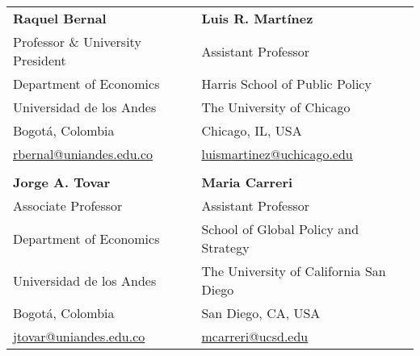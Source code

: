 \documentclass[margin,line]{res}
\begin{document}
\begin{resume}
\begin{tabular}{p{7cm}p{7cm}}
   \textbf{Raquel Bernal}                           & \textbf{Luis R. Martínez}      \\
   Professor \& University President                & Assistant Professor            \\     
   Department of Economics                          & Harris School of Public Policy \\   
   Universidad de los Andes                         & The University of Chicago      \\
   Bogotá, Colombia                                 & Chicago, IL, USA               \\   
   \href{mailto:rbernal@uniandes.edu.co}{rbernal@uniandes.edu.co} &  \href{mailto:luismartinez@uchicago.edu}{luismartinez@uchicago.edu} \\
   \\
   \textbf{Jorge A. Tovar}                             & \textbf{Maria Carreri}                 \\
   Associate Professor                              & Assistant Professor                       \\     
   Department of Economics                          & School of Global Policy and Strategy      \\   
   Universidad de los Andes                         & The University of California San Diego    \\
   Bogotá, Colombia                                 & San Diego, CA, USA                        \\      
   \href{mailto:jtovar@uniandes.edu.co}{jtovar@uniandes.edu.co} &  
   \href{mailto:mcarreri@ucsd.edu}{mcarreri@ucsd.edu}
\end{tabular}

\end{resume}
\end{document}
